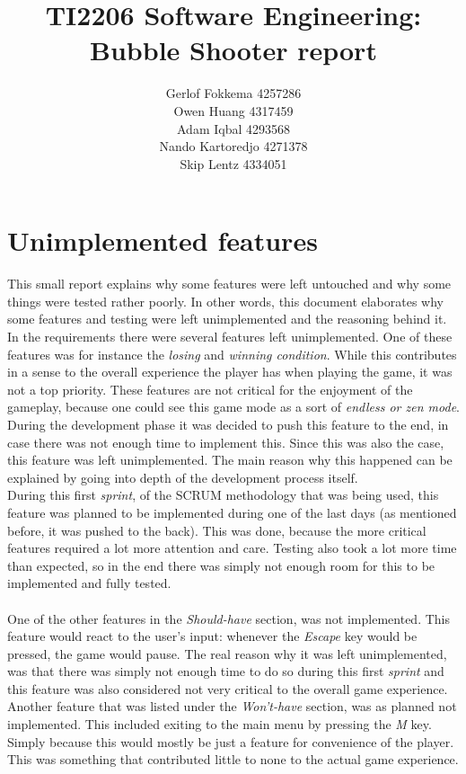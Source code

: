 \documentclass[a4paper,11pt]{article}
\title{TI2206 Software Engineering: Bubble Shooter report}
\author{Gerlof Fokkema 4257286 \\
	Owen Huang 4317459 \\
	Adam Iqbal 4293568 \\
	Nando Kartoredjo 4271378 \\
	Skip Lentz 4334051 \\
}
\begin{document}
\maketitle

\newpage
\section*{Unimplemented features}
This small report explains why some features were left untouched and why some things were tested rather poorly. In other words, this document elaborates why some features and testing were left unimplemented and the reasoning behind it. \\
\noindent
In the requirements there were several features left unimplemented. One of these features was for instance the \textit{losing} and \textit{winning condition}.
While this contributes in a sense to the overall experience the player has when playing the game, it was not a top priority. These features are not critical for the enjoyment of the gameplay, because one could see this game mode as a sort of \textit{endless or zen mode}. During the development phase it was decided to push this feature to the end, in case there was not enough time to implement this. Since this was also the case, this feature was left unimplemented. The main reason why this happened can be explained by going into depth of the development process itself. \\
\indent During this first \textit{sprint}, of the SCRUM methodology that was being used, this feature was planned to be implemented during one of the last days (as mentioned before, it was pushed to the back). This was done, because the more critical features required a lot more attention and care. Testing also took a lot more time than expected, so in the end there was simply not enough room for this to be implemented and fully tested. \\\\
\noindent
One of the other features in the \textit{Should-have} section, was not implemented. This feature would react to the user's input: whenever the \textit{Escape} key would be pressed, the game would pause. The real reason why it was left unimplemented, was that there was simply not enough time to do so during this first \textit{sprint} and this feature was also considered not very critical to the overall game experience.
Another feature that was listed under the \textit{Won't-have} section, was as planned not implemented. This included exiting to the main menu by pressing the \textit{M} key.  Simply because this would mostly be just a feature for convenience of the player. This was something that contributed little to none to the actual game experience.
\end{document}
